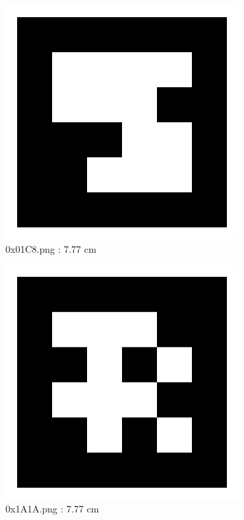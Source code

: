 \documentclass[11pt,a4,BCOR=0cm]{scrartcl}
\begin{document}
\begin{figure}
  \centering
    \includegraphics[natwidth=400,natheight=400,width=9cm]{0x01C8.png}
    \caption{0x01C8.png : 7.77 cm}
    \label{fig:0x01C8.png}
  
\end{figure} 

\begin{figure}
  \centering
    \includegraphics[natwidth=400,natheight=400,width=9cm]{0x1A1A.png}
    \caption{0x1A1A.png : 7.77 cm}
    \label{fig:0x1A1A.png}
  
\end{figure} 

\clearpage
\end{document}
